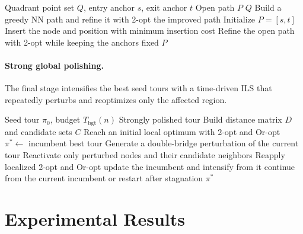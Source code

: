 \documentclass[runningheads]{llncs}
\begin{document}
\begin{algorithm}
\caption{\textsc{AnchoredPath} --- anchored intra-quadrant construction}
\label{alg:anchored}
\begin{algorithmic}[1]
\Require Quadrant point set $Q$, entry anchor $s$, exit anchor $t$
\Ensure Open path $P$
  \State \Return $Q$
\EndIf
{}
  \State Build a greedy NN path and refine it with 2-opt
  \State \Return the improved path
\EndIf
\State Initialize $P=[s,t]$
  \State Insert the node and position with minimum insertion cost
\EndWhile
\State Refine the open path with 2-opt while keeping the anchors fixed
\State \Return $P$
\end{algorithmic}
\end{algorithm}

\paragraph{Strong global polishing.}
The final stage intensifies the best seed tours with a time-driven ILS
that repeatedly perturbs and reoptimizes only the affected region.

\begin{algorithm}
\caption{\textsc{StrongPolish} --- time-driven global intensification}
\label{alg:polish}
\begin{algorithmic}[1]
\Require Seed tour $\pi_0$, budget $T_{\text{bgt}}(n)$
\Ensure Strongly polished tour
\State Build distance matrix $D$ and candidate sets $C$
\State Reach an initial local optimum with 2-opt and Or-opt
\State $\pi^*\gets$ incumbent best tour
  \State Generate a double-bridge perturbation of the current tour
  \State Reactivate only perturbed nodes and their candidate neighbors
  \State Reapply localized 2-opt and Or-opt
    \State update the incumbent and intensify from it
  \Else
    \State continue from the current incumbent or restart after stagnation
  \EndIf
\EndWhile
\State \Return $\pi^*$
\end{algorithmic}
\end{algorithm}

\section{Experimental Results}
\label{sec:experiments}
\end{document}
